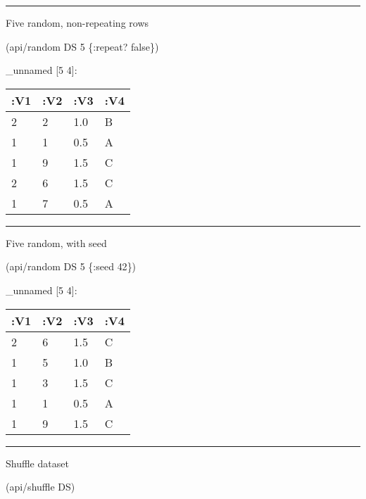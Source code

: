 \documentclass[]{article}
\newenvironment{Shaded}{\begin{snugshade}}{\end{snugshade}}
\newcommand{\AttributeTok}[1]{\textcolor[rgb]{0.77,0.63,0.00}{#1}}
\newcommand{\DecValTok}[1]{\textcolor[rgb]{0.00,0.00,0.81}{#1}}
\newcommand{\NormalTok}[1]{#1}
\newcommand{\VariableTok}[1]{\textcolor[rgb]{0.00,0.00,0.00}{#1}}
\begin{document}
\begin{center}\rule{0.5\linewidth}{0.5pt}\end{center}

Five random, non-repeating rows

\begin{Shaded}
\begin{Highlighting}[]
\NormalTok{(api/random DS }\DecValTok{5}\NormalTok{ \{}\AttributeTok{:repeat}\NormalTok{? }\VariableTok{false}\NormalTok{\})}
\end{Highlighting}
\end{Shaded}

\_unnamed {[}5 4{]}:

\begin{longtable}[]{@{}llll@{}}
\toprule
:V1 & :V2 & :V3 & :V4\tabularnewline
\midrule
\endhead
2 & 2 & 1.0 & B\tabularnewline
1 & 1 & 0.5 & A\tabularnewline
1 & 9 & 1.5 & C\tabularnewline
2 & 6 & 1.5 & C\tabularnewline
1 & 7 & 0.5 & A\tabularnewline
\bottomrule
\end{longtable}

\begin{center}\rule{0.5\linewidth}{0.5pt}\end{center}

Five random, with seed

\begin{Shaded}
\begin{Highlighting}[]
\NormalTok{(api/random DS }\DecValTok{5}\NormalTok{ \{}\AttributeTok{:seed} \DecValTok{42}\NormalTok{\})}
\end{Highlighting}
\end{Shaded}

\_unnamed {[}5 4{]}:

\begin{longtable}[]{@{}llll@{}}
\toprule
:V1 & :V2 & :V3 & :V4\tabularnewline
\midrule
\endhead
2 & 6 & 1.5 & C\tabularnewline
1 & 5 & 1.0 & B\tabularnewline
1 & 3 & 1.5 & C\tabularnewline
1 & 1 & 0.5 & A\tabularnewline
1 & 9 & 1.5 & C\tabularnewline
\bottomrule
\end{longtable}

\begin{center}\rule{0.5\linewidth}{0.5pt}\end{center}

Shuffle dataset

\begin{Shaded}
\begin{Highlighting}[]
\NormalTok{(api/shuffle DS)}
\end{Highlighting}
\end{Shaded}
\end{document}
